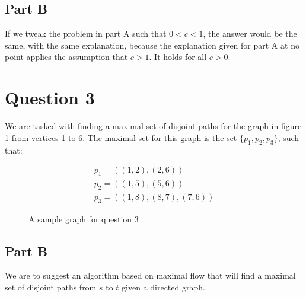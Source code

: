 \documentclass{article}
\begin{document}
\subsection*{Part B}

If we tweak the problem in part A such that \(0 < c < 1\), the answer would be the same, with the same explanation, because the explanation given for part A at no point applies the assumption that \(c > 1\). It holds for all \(c > 0\).

\section*{Question 3}

We are tasked with finding a maximal set of disjoint paths for the graph in figure \ref{q3} from vertices 1 to 6. The maximal set for this graph is the set \(\{p_1, p_2, p_3\}\), such that:

\begin{gather*}
	p_1 = ((1,2), (2,6)) \\
	p_2 = ((1,5), (5,6)) \\
	p_3 = ((1,8), (8,7), (7,6))
\end{gather*}

\begin{figure}[htbp]
	\centering
	\caption{A sample graph for question 3}
	\label{q3}
\end{figure}

\subsection*{Part B}

We are to suggest an algorithm based on maximal flow that will find a maximal set of disjoint paths from \(s\) to \(t\) given a directed graph.
\end{document}
